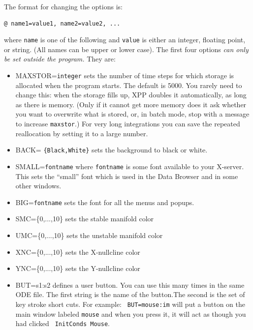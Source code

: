 \documentclass{article}
\newcommand{\bvb}{\begin{verbatim}}
\begin{document}
The format for changing the options is:
\bvb
@ name1=value1, name2=value2, ...
\end{verbatim}
where {\tt name} is one of the following and {\tt value} is either an
integer, floating point, or string.  (All names can be upper or lower
case). The first four options {\em can
only be set outside the program.}  They are:
\begin{itemize}
\item MAXSTOR={\tt integer} sets the number of time steps for which
storage is allocated when the program starts.  The default is 5000.  You rarely need to change this:  when the storage
fills up, XPP doubles it automatically, as long as there is memory.  (Only if it cannot get more memory
does it ask whether you want to overwrite what is stored, or, in batch mode, stop with a message to increase {\tt maxstor}.)
For very long integrations you can save the repeated reallocation by setting it to a large number.  
\item BACK= {\tt \{Black,White\}} sets the background to black or white.
\item SMALL={\tt fontname} where {\tt fontname} is some font available
to your X-server.  This sets the ``small'' font which is used in the
Data Browser and in some other windows.  
\item BIG={\tt fontname} sets the font for all the menus and popups.  
\item SMC=\{0,...,10\} sets the stable manifold color
\item UMC=\{0,...,10\} sets the unstable manifold color
\item XNC=\{0,...,10\} sets the X-nullcline color
\item YNC=\{0,...,10\} sets the Y-nullcline color
\item BUT=s1:s2 defines a user button. You can use this many times in
the same ODE file. The first string is the name of the button.The
second is the set of key stroke short cuts. For example: {\tt
BUT=mouse:im} will put a button on the main window labeled {\tt mouse}
and when you press it, it will act as though you had clicked {\tt
InitConds Mouse}.   
\end{itemize}
\end{document}
